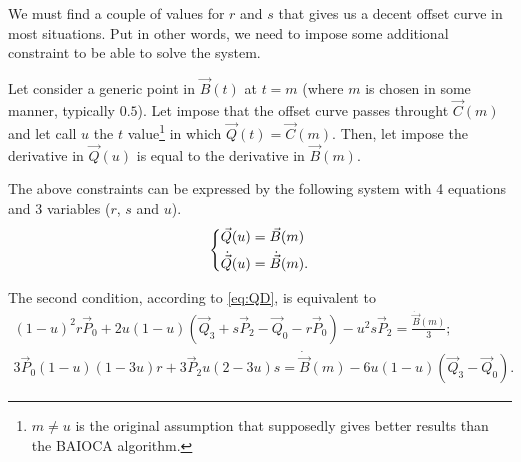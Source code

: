 \documentclass{scrartcl}
\newcommand\V[1]{\vec{#1}}
\newcommand\D[1]{\dot{#1}}
\newcommand\DV[1]{\D{\V{#1}}}
\begin{document}
We must find a couple of values for $r$ and $s$ that gives us a decent
offset curve in most situations. Put in other words, we need to impose
some additional constraint to be able to solve the system.

Let consider a generic point in $\V{B}(t)$ at $t=m$ (where $m$ is chosen
in some manner, typically $0.5$). Let impose that the offset curve passes
throught $\V{C}(m)$ and let call $u$ the $t$ value\footnote{$m \neq u$
is the original assumption that supposedly gives better results than the
BAIOCA algorithm.} in which $\V{Q}(t) = \V{C}(m)$. Then, let impose the
derivative in $\V{Q}(u)$ is equal to the derivative in $\V{B}(m)$.

The above constraints can be expressed by the following system with 4
equations and 3 variables ($r$, $s$ and $u$).
\begin{equation*}
\begin{dcases}
    \V{Q}(u) = \V{B}(m)\\
    \DV{Q}(u) = \DV{B}(m).
\end{dcases}
\end{equation*}

The second condition, according to \eqref{eq:QD}, is equivalent to
\begin{equation*}
\begin{aligned}
    (1-u)^2 r \V{P}_0 +
	2u(1-u) (\V{Q}_3 + s \V{P}_2 - \V{Q}_0 - r \V{P}_0) -
	u^2 s \V{P}_2 =
	\frac{\DV{B}(m)}{3}; \\
    3 \V{P}_0 (1-u)(1-3u) r + 3 \V{P}_2 u(2-3u) s =
	\DV{B}(m) - 6u(1-u) (\V{Q}_3 - \V{Q}_0).
\end{aligned}
\end{equation*}
\end{document}
